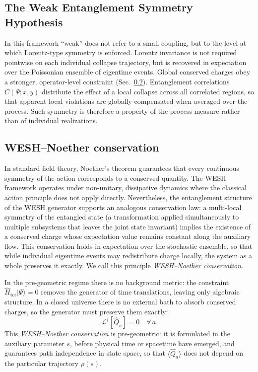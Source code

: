 \documentclass[12pt,a4paper]{article}
\numberwithin{equation}{section}
\begin{document}
\vspace{0.5cm}
\subsection{The Weak Entanglement Symmetry Hypothesis}

\vspace{0.3cm}

In this framework ``weak'' does not refer to a small coupling, but to the 
level at which Lorentz-type symmetry is enforced. Lorentz invariance is not 
required pointwise on each individual collapse trajectory, but is recovered 
in expectation over the Poissonian ensemble of eigentime events. Global 
conserved charges obey a stronger, operator-level constraint 
(Sec.~\ref{sec:wesh-noether}). Entanglement correlations $C(\Psi;x,y)$ distribute the effect of a local collapse across all correlated regions, so that apparent local violations are globally compensated when averaged over the process. Such symmetry is therefore a property of the process measure rather than of individual realizations.

\vspace{0.5cm}

\subsection{WESH--Noether conservation}
\label{sec:wesh-noether}

\vspace{0.3cm}

In standard field theory, Noether's theorem guarantees that every continuous symmetry of the action corresponds to a conserved quantity. The WESH framework operates under non-unitary, dissipative dynamics where the classical action principle does not apply directly. Nevertheless, the entanglement structure of the WESH generator supports an analogous conservation law: a multi-local symmetry of the entangled state (a transformation applied simultaneously to multiple subsystems that leaves the joint state invariant) implies the existence of a conserved charge whose expectation value remains constant along the auxiliary flow. This conservation holds in expectation over the stochastic ensemble, so that while individual eigentime events may redistribute charge locally, the system as a whole preserves it exactly. We call this principle \emph{WESH--Noether conservation}.

In the pre-geometric regime there is no background metric: the constraint 
$\hat{H}_{\mathrm{tot}}|\Psi\rangle = 0$ removes the generator of time 
translations, leaving only algebraic structure. In a closed universe 
there is no external bath to absorb conserved charges, so the generator 
must preserve them exactly:
\begin{equation}
\mathcal{L}^\dagger[\hat{Q}_a] = 0 \quad \forall\, a.
\label{eq:wesh-noether-constraint}
\end{equation}
This \emph{WESH--Noether conservation} is pre-geometric: it is formulated
in the auxiliary parameter $s$, before physical time or spacetime have
emerged, and guarantees path independence in state space, so that
$\langle\hat{Q}_a\rangle$ does not depend on the particular trajectory
$\rho(s)$.
\end{document}
